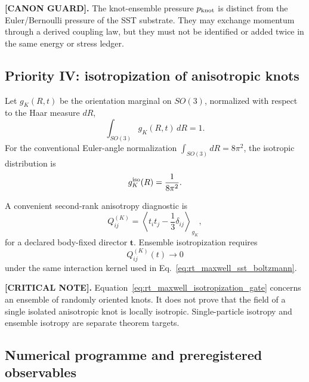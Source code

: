 \textbf{[CANON GUARD].}
The knot-ensemble pressure $p_{\rm knot}$ is distinct from the Euler/Bernoulli
pressure of the SST substrate.  They may exchange momentum through a derived
coupling law, but they must not be identified or added twice in the same energy
or stress ledger.

\subsection{Priority IV: isotropization of anisotropic knots}
    \label{subsec:rt_maxwell_orientation_isotropy}

Let $g_K(R,t)$ be the orientation marginal on $SO(3)$, normalized with respect
to the Haar measure $dR$,
\begin{equation}
    \int_{SO(3)} g_K(R,t)\,dR=1.
    \label{eq:rt_maxwell_orientation_normalization}
\end{equation}
For the conventional Euler-angle normalization
$\int_{SO(3)}dR=8\pi^2$, the isotropic distribution is
\begin{equation}
    g_K^{\rm iso}(R)
    =
    \frac{1}{8\pi^2}.
    \label{eq:rt_maxwell_orientation_isotropic}
\end{equation}

A convenient second-rank anisotropy diagnostic is
\begin{equation}
    Q_{ij}^{(K)}
    =
    \left\langle
        t_i t_j-\frac{1}{3}\delta_{ij}
    \right\rangle_{g_K},
    \label{eq:rt_maxwell_orientation_tensor}
\end{equation}
for a declared body-fixed director $\mathbf t$.  Ensemble isotropization requires
\begin{equation}
    Q_{ij}^{(K)}(t)
    \longrightarrow
    0
    \label{eq:rt_maxwell_isotropization_gate}
\end{equation}
under the same interaction kernel used in
Eq.~\eqref{eq:rt_maxwell_sst_boltzmann}.

\textbf{[CRITICAL NOTE].}
Equation~\eqref{eq:rt_maxwell_isotropization_gate} concerns an ensemble of
randomly oriented knots.  It does not prove that the field of a single isolated
anisotropic knot is locally isotropic.  Single-particle isotropy and ensemble
isotropy are separate theorem targets.

\subsection{Numerical programme and preregistered observables}
    \label{subsec:rt_maxwell_numerical_programme}

